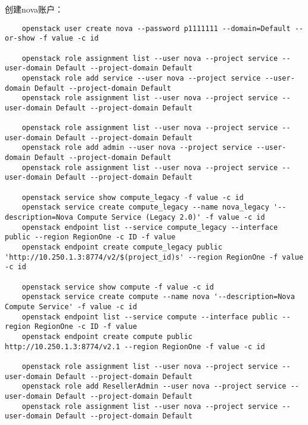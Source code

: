 \documentclass[a4paper,left=1.5cm,right=1.5cm,11pt]{article}
\begin{document}
	创建nova账户：
	\begin{lstlisting}
	openstack user create nova --password p1111111 --domain=Default --or-show -f value -c id
	
	openstack role assignment list --user nova --project service --user-domain Default --project-domain Default
	openstack role add service --user nova --project service --user-domain Default --project-domain Default
	openstack role assignment list --user nova --project service --user-domain Default --project-domain Default
	
	openstack role assignment list --user nova --project service --user-domain Default --project-domain Default
	openstack role add admin --user nova --project service --user-domain Default --project-domain Default
	openstack role assignment list --user nova --project service --user-domain Default --project-domain Default
	
	openstack service show compute_legacy -f value -c id
	openstack service create compute_legacy --name nova_legacy '--description=Nova Compute Service (Legacy 2.0)' -f value -c id
	openstack endpoint list --service compute_legacy --interface public --region RegionOne -c ID -f value
	openstack endpoint create compute_legacy public 'http://10.250.1.3:8774/v2/$(project_id)s' --region RegionOne -f value -c id
	
	openstack service show compute -f value -c id
	openstack service create compute --name nova '--description=Nova Compute Service' -f value -c id
	openstack endpoint list --service compute --interface public --region RegionOne -c ID -f value
	openstack endpoint create compute public http://10.250.1.3:8774/v2.1 --region RegionOne -f value -c id
	
	openstack role assignment list --user nova --project service --user-domain Default --project-domain Default
	openstack role add ResellerAdmin --user nova --project service --user-domain Default --project-domain Default
	openstack role assignment list --user nova --project service --user-domain Default --project-domain Default
	\end{lstlisting}
\end{document}
